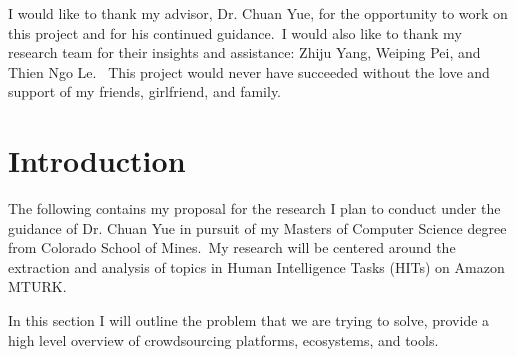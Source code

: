 \documentclass[letterpaper,12pt]{article}
\begin{document}
\begin{acknowledgments}
I would like to thank my advisor, Dr. Chuan Yue, for the opportunity to work on this project and for his continued guidance.\
I would also like to thank my research team for their insights and assistance: Zhiju Yang, Weiping Pei, and Thien Ngo Le. \
This project would never have succeeded without the love and support of my friends, girlfriend, and family.
\end{acknowledgments}
\newpage




\bodymatter



\chapter{Introduction}

The following contains my proposal for the research I plan to conduct under the guidance of Dr. Chuan Yue in pursuit of my Masters of Computer Science degree from Colorado School of Mines.\
My research will be centered around the extraction and analysis of topics in Human Intelligence Tasks (HITs) on Amazon MTURK. 

In this section I will outline the problem that we are trying to solve, provide a high level overview of crowdsourcing platforms, ecosystems, and tools.
\end{document}
